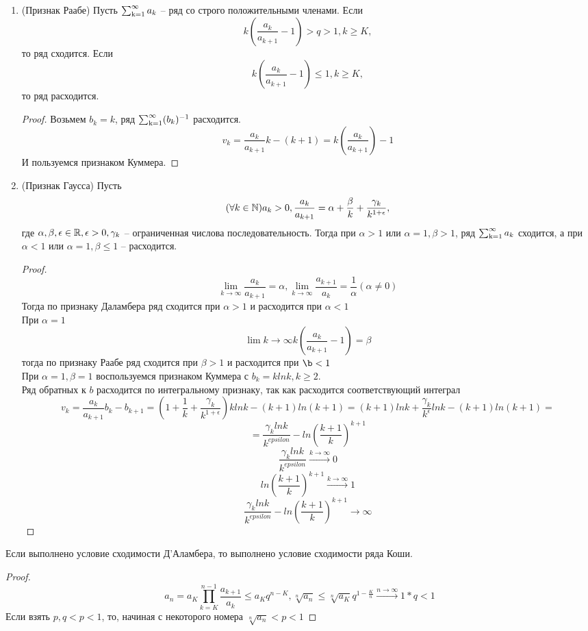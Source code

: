 \begin{enumerate}
\begin{proof}
т.е. $a_k b_k - a_{k+!}b_{k+1}\le 0 k \ge$. Значит, $$ \sum_{k=K}^{n-1} \big( a_k b_k-a_{k+1}b_{k+1} \big) = a_K b_K - a_n b_n \le 0, n>K$$
отсюда: $a_N \ge a_Kb_K - (b_n)^{-1}$. Из расходимости ряда $\ssum b_k$ следует расходимость ряда $\ssum a_k$
\end{proof}
\item
(Признак Раабе) Пусть $\ssum a_k$ -- ряд со строго положительными членами.
Если $$k \left( \frac{a_k}{a_{k+1}} -1 \right) > q > 1, k \ge K,$$
то ряд сходится.
Если $$k \left( \frac{a_k}{a_{k+1}} -1 \right) \le 1, k \ge K,$$
то ряд расходится.
\begin{proof}
Возьмем $b_k =k$, ряд $\operatorname{\sum_{k=1}^{\infty}} (b_k)^{-1}$ расходится.
$$v_k = \frac{a_k}{a_{k+1}}k - (k+1) = k (\frac{a_k}{a_{k+1}}) -1 $$
И пользуемся признаком Куммера.
\end{proof}
\item
(Признак Гаусса) Пусть 
$$(\forall k \in \operatorname{\mathbb{N}}) a_k>0, \frac{a_k}{a_{k+1}} = \alpha + \frac{\beta}{k}+\frac{\gamma_k}{k^{1+\epsilon}}, $$
где $\alpha, \beta, \epsilon \in \operatorname{\mathbb{R}}, \epsilon > 0, \gamma_k$ -- ограниченная числова последовательность.
Тогда при $\alpha > 1$ или $\alpha = 1, \beta > 1$, ряд $\ssum a_k$ сходится, а  при $\alpha < 1$ или $\alpha = 1, \beta \le 1$ -- расходится.
\begin{proof}
$$\lim_{k \to \infty} \frac{a_k}{a_{k+1}} = \alpha, \lim_{k \to \infty} \frac{a_{k+1}}{a_k} = \frac{1}{\alpha} (\alpha \not=0)$$
Тогда по признаку Даламбера ряд сходится при $\alpha > 1$ и расходится при $\alpha < 1$\\
При $\alpha = 1$\\
$$\lim{k \to \infty} k ( \frac{a_k}{a_{k+1}} -1 ) = \beta $$
тогда по признаку Раабе ряд сходится при $\beta > 1$ и расходится при $\b < 1$\\
При $\alpha =1, \beta =1$ воспользуемся признаком Куммера с $b_k = k ln k, k\ge 2.$\\
Ряд обратных к $b$ расходится по интегральному признаку, так как расходится соответствующий интеграл
$$v_k = \frac{a_k}{a_{k+1}}b_k - b_{k+1} = \left(1 + \frac{1}{k} + \frac{\gamma_k}{k^{1+\epsilon}} \right) k lnk - (k+1)ln(k+1) = 
(k+1)lnk + \frac{\gamma_k}{k^{\epsilon}}ln k - (k+1)ln(k+1) =$$
$$ = \frac{\gamma_k lnk}{k^{epsilon}} - ln(\frac{k+1}{k})^{k+1}$$
$$\frac{\gamma_k lnk}{k^{epsilon}} \xrightarrow{k \to \infty} 0$$
$$ln(\frac{k+1}{k})^{k+1} \xrightarrow{k \to \infty} 1$$
$$\frac{\gamma_k lnk}{k^{epsilon}} - ln(\frac{k+1}{k})^{k+1} \to \infty $$
\end{proof}
\end{enumerate}
\begin{thm}
Если выполнено условие сходимости Д'Аламбера, то выполнено условие сходимости ряда Коши.
\end{thm}
\begin{proof}
$$a_n = a_K \prod_{k=K}^{n-1} \frac{a_{k+1}}{a_k} \le a_K q^{n-K}, \sqrt[n]{a_n} \le \sqrt[n]{a_K}q^{1-\frac{K}{n}} \xrightarrow{n \to \infty} 1*q < 1$$
Если взять $p, q<p<1$, то, начиная с некоторого номера $\sqrt[n]{a_n}<p<1$
\end{proof}
